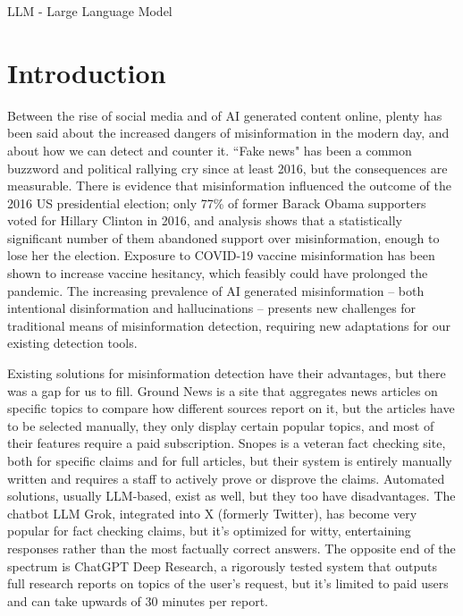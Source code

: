 \documentclass[conference]{IEEEtran}
\begin{document}
\begin{IEEEkeywords} %
LLM - Large Language Model
\end{IEEEkeywords}

\section{Introduction}
Between the rise of social media and of AI generated content online, plenty has been said about the increased dangers of misinformation in the modern day, and about how we can detect and counter it. ``Fake news" has been a common buzzword and political rallying cry since at least 2016, but the consequences are measurable. There is evidence that misinformation influenced the outcome of the 2016 US presidential election; only 77\% of former Barack Obama supporters voted for Hillary Clinton in 2016, and analysis shows that a statistically significant number of them abandoned support over misinformation, enough to lose her the election\cite{2016ElectionStats}. Exposure to COVID-19 vaccine misinformation has been shown to increase vaccine hesitancy, which feasibly could have prolonged the pandemic\cite{Loomba2021}. The increasing prevalence of AI generated misinformation -- both intentional disinformation and hallucinations -- presents new challenges for traditional means of misinformation detection, requiring new adaptations for our existing detection tools\cite{Zhou2023}.

Existing solutions for misinformation detection have their advantages, but there was a gap for us to fill. Ground News is a site that aggregates news articles on specific topics to compare how different sources report on it, but the articles have to be selected manually, they only display certain popular topics, and most of their features require a paid subscription\cite{groundNews}. Snopes is a veteran fact checking site, both for specific claims and for full articles, but their system is entirely manually written and requires a staff to actively prove or disprove the claims\cite{Snopes}. Automated solutions, usually LLM-based, exist as well, but they too have disadvantages. The chatbot LLM Grok\cite{Grok4}, integrated into X (formerly Twitter), has become very popular for fact checking claims\cite{esteban_ponce_de_leon_grok_2025}, but it's optimized for witty, entertaining responses rather than the most factually correct answers\cite{xai_xai_announcing_2023}. The opposite end of the spectrum is ChatGPT Deep Research\cite{DeepResearch}, a rigorously tested system that outputs full research reports on topics of the user's request, but it's limited to paid users and can take upwards of 30 minutes per report\cite{introducingDR}.
\end{document}
